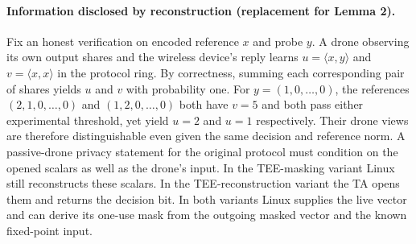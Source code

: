 \paragraph{Information disclosed by reconstruction (replacement for Lemma 2).}
Fix an honest verification on encoded reference $x$ and probe $y$. A drone
observing its own output shares and the wireless device's reply learns
$u=\langle x,y\rangle$ and $v=\langle x,x\rangle$ in the protocol ring.
By correctness, summing each corresponding pair of shares yields $u$ and $v$
with probability one. For $y=(1,0,\ldots,0)$, the references
$(2,1,0,\ldots,0)$ and $(1,2,0,\ldots,0)$ both have $v=5$ and both pass
either experimental threshold, yet yield $u=2$ and $u=1$ respectively.
Their drone views are therefore distinguishable even given the same decision
and reference norm. A passive-drone privacy statement for the original
protocol must condition on the opened scalars as well as the drone's input.
In the TEE-masking variant Linux still reconstructs these scalars. In the
TEE-reconstruction variant the TA opens them and returns the decision bit.
In both variants Linux supplies the live vector and can derive its one-use
mask from the outgoing masked vector and the known fixed-point input.
